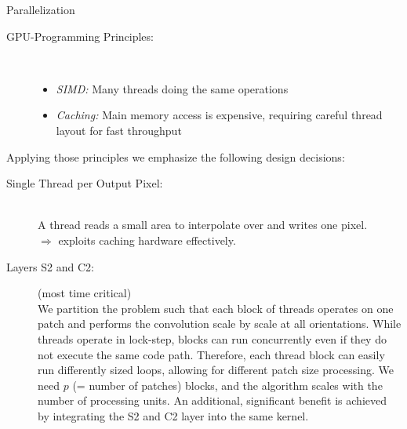 \documentclass[final]{beamer}
\begin{document}
\begin{frame}{}
\begin{columns}[t]
\begin{column}{.48\linewidth}
        \begin{block}{Parallelization}
\begin{description}
\item[GPU-Programming Principles:]~
	\begin{itemize}
		\item \emph{SIMD:} Many threads doing the same operations
		\item \emph{Caching:} Main memory access is expensive, requiring careful thread layout for fast throughput
	\end{itemize}
\end{description}
Applying those principles we emphasize the following design decisions:
\begin{description}
\item[Single Thread per Output Pixel:]~\\
A thread reads a small area to interpolate over and writes one pixel.\\
$\Rightarrow$ exploits caching hardware effectively.

\item[Layers S2 and C2:] (most time critical)\\
We partition the problem such that each block of threads operates on one patch and performs the convolution scale by scale at all orientations. \nesline
While threads operate in lock-step, blocks can run concurrently even if they do not execute the same code path. Therefore, each thread block can easily run differently sized loops, allowing for different patch size processing. We need $p$ (= number of patches) blocks, and the algorithm scales
with the number of processing units. \newline
An additional, significant benefit is achieved by integrating the S2
and C2 layer into the same kernel.

\end{description}

        \end{block}        
        
      \end{column}
      
      

\end{columns}
\end{frame}
\end{document}
